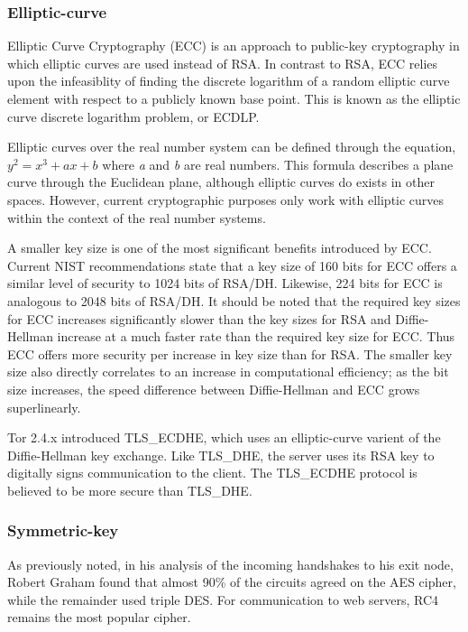 \documentclass[journal]{IEEEtran}
\begin{document}
\subsubsection{Elliptic-curve}

Elliptic Curve Cryptography (ECC) is an approach to public-key cryptography in which elliptic curves are used instead of RSA. In contrast to RSA, ECC relies upon the infeasiblity of finding the discrete logarithm of a random elliptic curve element with respect to a publicly known base point. This is known as the elliptic curve discrete logarithm problem, or ECDLP.

Elliptic curves over the real number system can be defined through the equation, $ y^2 = x^3 + ax + b $ where \textit{a} and \textit{b} are real numbers. This formula describes a plane curve through the Euclidean plane, although elliptic curves do exists in other spaces. However, current cryptographic purposes only work with elliptic curves within the context of the real number systems.

A smaller key size is one of the most significant benefits introduced by ECC. Current NIST recommendations state that a key size of 160 bits for ECC offers a similar level of security to 1024 bits of RSA/DH. Likewise, 224 bits for ECC is analogous to 2048 bits of RSA/DH. It should be noted that the required key sizes for ECC increases significantly slower than the key sizes for RSA and Diffie-Hellman increase at a much faster rate than the required key size for ECC. Thus ECC offers more security per increase in key size than for RSA. The smaller key size also directly correlates to an increase in computational efficiency; as the bit size increases, the speed difference between Diffie-Hellman and ECC grows superlinearly.\cite{CaseForECC}

Tor 2.4.x introduced TLS\_ECDHE, which uses an elliptic-curve varient of the Diffie-Hellman key exchange. Like TLS\_DHE, the server uses its RSA key to digitally signs communication to the client. The TLS\_ECDHE protocol is believed to be more secure than TLS\_DHE.

\subsubsection{Symmetric-key}


As previously noted, in his analysis of the incoming handshakes to his exit node, Robert Graham found that almost 90\% of the circuits agreed on the AES cipher, while the remainder used triple DES. For communication to web servers, RC4 remains the most popular cipher.
\end{document}
